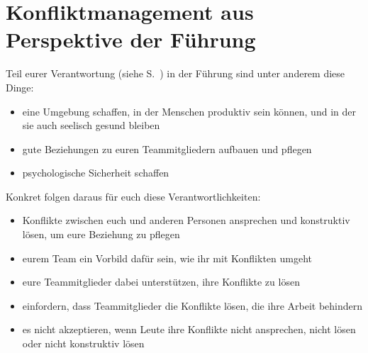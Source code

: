 \section{Konfliktmanagement aus Perspektive der Führung}
\label{konflikte-fuehrung}

Teil eurer Verantwortung (siehe S.~\pageref{fuehrung-aufgaben-neuberger}) in der Führung sind unter anderem diese Dinge:

\begin{itemize}
    \item eine Umgebung schaffen, in der Menschen produktiv sein können, und in der sie auch seelisch gesund bleiben
    \item gute Beziehungen zu euren Teammitgliedern aufbauen und pflegen
    \item psychologische Sicherheit schaffen
\end{itemize}

Konkret folgen daraus für euch diese Verantwortlichkeiten:

\begin{itemize}
    \item Konflikte zwischen euch und anderen Personen ansprechen und konstruktiv lösen, um eure Beziehung zu pflegen
    \item eurem Team ein Vorbild dafür sein, wie ihr mit Konflikten umgeht
    \item eure Teammitglieder dabei unterstützen, ihre Konflikte zu lösen
    \item einfordern, dass Teammitglieder die Konflikte lösen, die ihre Arbeit behindern
    \item es nicht akzeptieren, wenn Leute ihre Konflikte nicht ansprechen, nicht lösen oder nicht konstruktiv lösen
\end{itemize}
